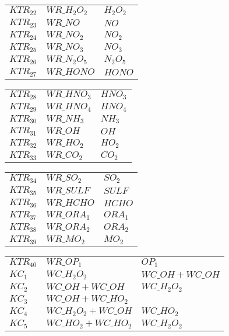 {\begin{tabular}{l@{\,:\,}p{0.2\chfwidth}@{$\quad\longrightarrow\quad$}p{0.6\chfwidth}}
$KTR_{22}$ & $WR\_H_{2}O_{2}$ & $H_{2}O_{2}$ \\
$KTR_{23}$ & $WR\_NO$ & $NO$ \\
$KTR_{24}$ & $WR\_NO_{2}$ & $NO_{2}$ \\
$KTR_{25}$ & $WR\_NO_{3}$ & $NO_{3}$ \\
$KTR_{26}$ & $WR\_N_{2}O_{5}$ & $N_{2}O_{5}$ \\
$KTR_{27}$ & $WR\_HONO$ & $HONO$ \\
\end{tabular}
 
\begin{tabular}{l@{\,:\,}p{0.2\chfwidth}@{$\quad\longrightarrow\quad$}p{0.6\chfwidth}}
$KTR_{28}$ & $WR\_HNO_{3}$ & $HNO_{3}$ \\
$KTR_{29}$ & $WR\_HNO_{4}$ & $HNO_{4}$ \\
$KTR_{30}$ & $WR\_NH_{3}$ & $NH_{3}$ \\
$KTR_{31}$ & $WR\_OH$ & $OH$ \\
$KTR_{32}$ & $WR\_HO_{2}$ & $HO_{2}$ \\
$KTR_{33}$ & $WR\_CO_{2}$ & $CO_{2}$ \\
\end{tabular}
 
\begin{tabular}{l@{\,:\,}p{0.2\chfwidth}@{$\quad\longrightarrow\quad$}p{0.6\chfwidth}}
$KTR_{34}$ & $WR\_SO_{2}$ & $SO_{2}$ \\
$KTR_{35}$ & $WR\_SULF$ & $SULF$ \\
$KTR_{36}$ & $WR\_HCHO$ & $HCHO$ \\
$KTR_{37}$ & $WR\_ORA_{1}$ & $ORA_{1}$ \\
$KTR_{38}$ & $WR\_ORA_{2}$ & $ORA_{2}$ \\
$KTR_{39}$ & $WR\_MO_{2}$ & $MO_{2}$ \\
\end{tabular}
 
\begin{tabular}{l@{\,:\,}p{0.2\chfwidth}@{$\quad\longrightarrow\quad$}p{0.6\chfwidth}}
$KTR_{40}$ & $WR\_OP_{1}$ & $OP_{1}$ \\
$KC_{1}$ & $WC\_H_{2}O_{2}$ & $WC\_OH+WC\_OH$ \\
$KC_{2}$ & $WC\_OH+WC\_OH$ & $WC\_H_{2}O_{2}$ \\
$KC_{3}$ & $WC\_OH+WC\_HO_{2}$ &  \\
$KC_{4}$ & $WC\_H_{2}O_{2}+WC\_OH$ & $WC\_HO_{2}$ \\
$KC_{5}$ & $WC\_HO_{2}+WC\_HO_{2}$ & $WC\_H_{2}O_{2}$ \\
\end{tabular}
 
}

